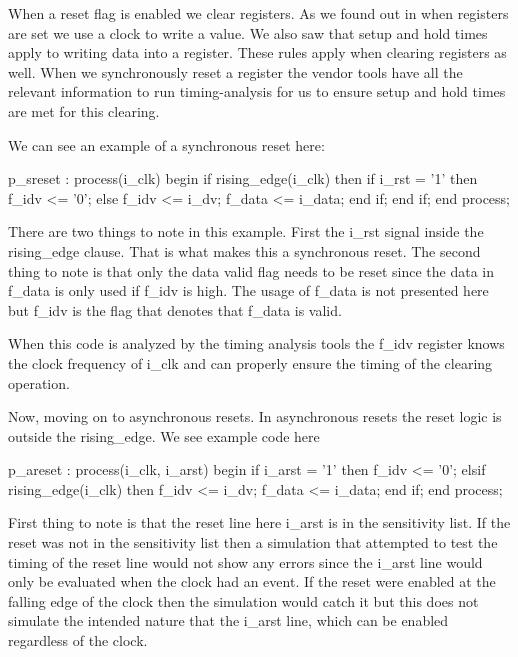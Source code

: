 When a reset flag is enabled we clear registers. As we found out in  when registers are set we use a clock to write a value. We also saw that setup and hold times apply to writing data into a register. These rules apply when clearing registers as well. When we synchronously reset a register the vendor tools have all the relevant information to run timing-analysis for us to ensure setup and hold times are met for this clearing. 

We can see an example of a synchronous reset here:

\begin{VHDLlisting}[tabsize=4]
p_sreset : process(i_clk)
begin
    if rising_edge(i_clk) then
        if i_rst = '1' then
            f_idv <= '0';
        else
            f_idv <= i_dv;
            f_data <= i_data;		
        end if;	
    end if;
end process;
\end{VHDLlisting}

There are two things to note in this example. First the i\_rst signal inside the rising\_edge clause. That is what makes this a synchronous reset. The second thing to note is that only the data valid flag needs to be reset since the data in f\_data is only used if f\_idv is high. The usage of f\_data is not presented here but f\_idv is the flag that denotes that f\_data is valid. 

When this code is analyzed by the timing analysis tools the f\_idv register knows the clock frequency of i\_clk and can properly ensure the timing of the clearing operation. 

Now, moving on to asynchronous resets. In asynchronous resets the reset logic is outside the rising\_edge. We see example code here

\begin{VHDLlisting}[tabsize=4]
p_areset : process(i_clk, i_arst)
begin
    if i_arst = '1' then
        f_idv <= '0';
    elsif rising_edge(i_clk) then
        f_idv <= i_dv;
        f_data <= i_data;		
    end if;
end process;
\end{VHDLlisting}

First thing to note is that the reset line here i\_arst is in the sensitivity list. If the reset was not in the sensitivity list then a simulation that attempted to test the timing of the reset line would not show any errors since the i\_arst line would only be evaluated when the clock had an event. If the reset were enabled at the falling edge of the clock then the simulation would catch it but this does not simulate the intended nature that the i\_arst line, which can be enabled regardless of the clock. 

